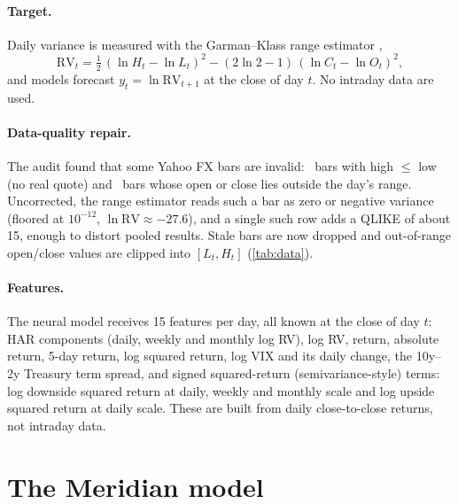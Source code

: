 \documentclass[11pt,a4paper]{article}
\begin{document}
\paragraph{Target.} Daily variance is measured with the Garman--Klass range estimator
\cite{garmanklass1980},
\begin{equation}
\mathrm{RV}_t = \tfrac12\,(\ln H_t - \ln L_t)^2 - (2\ln 2 - 1)\,(\ln C_t - \ln O_t)^2 ,
\end{equation}
and models forecast $y_t = \ln \mathrm{RV}_{t+1}$ at the close of day $t$. No intraday data are used.

\paragraph{Data-quality repair.} The audit found that some Yahoo FX bars are invalid: \NStale\ bars with
high $\le$ low (no real quote) and \NClipped\ bars whose open or close lies outside the day's range.
Uncorrected, the range estimator reads such a bar as zero or negative variance (floored at $10^{-12}$,
$\ln\mathrm{RV}\approx -27.6$), and a single such row adds a QLIKE of about 15, enough to distort pooled
results. Stale bars are now dropped and out-of-range open/close values are clipped into $[L_t,H_t]$
(\cref{tab:data}).



\paragraph{Features.} The neural model receives 15 features per day, all known at the close of day $t$:
HAR components (daily, weekly and monthly log RV), log RV, return, absolute return, 5-day return,
log squared return, log VIX and its daily change, the 10y--2y Treasury term spread, and signed
squared-return (semivariance-style) terms: log downside squared return at daily, weekly and monthly
scale and log upside squared return at daily scale. These are built from daily close-to-close returns,
not intraday data.

\section{The Meridian model}\label{sec:model}
\end{document}
